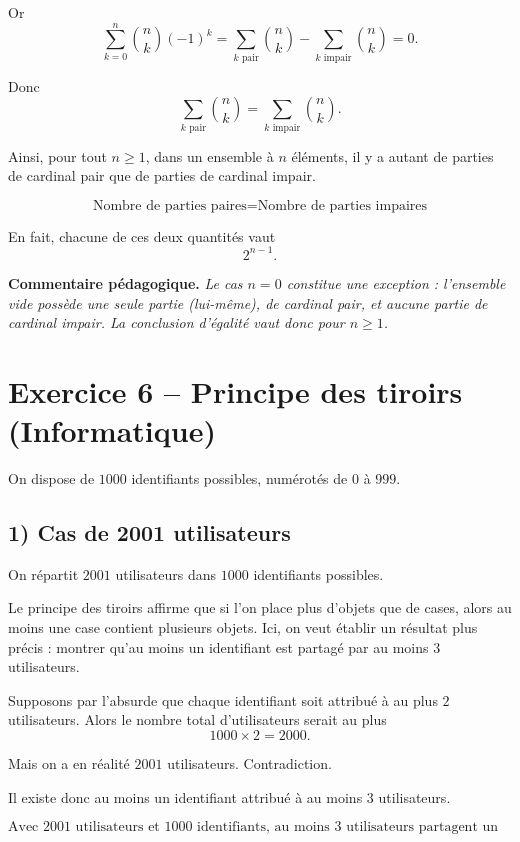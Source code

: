 \documentclass[12pt,a4paper]{article}
\newenvironment{pedago}
{\par\smallskip\noindent\textbf{Commentaire pédagogique. }\itshape}
{\par\smallskip}
\begin{document}
Or
\[
\sum_{k=0}^n \binom{n}{k} (-1)^k
=
\sum_{k\text{ pair}} \binom{n}{k}
-
\sum_{k\text{ impair}} \binom{n}{k}
=
0.
\]

Donc
\[
\sum_{k\text{ pair}} \binom{n}{k}
=
\sum_{k\text{ impair}} \binom{n}{k}.
\]

Ainsi, pour tout $n\ge 1$, dans un ensemble à $n$ éléments, il y a autant de parties de cardinal pair que de parties de cardinal impair.

\[
\boxed{\text{Nombre de parties paires}=\text{Nombre de parties impaires}}
\]

En fait, chacune de ces deux quantités vaut
\[
2^{n-1}.
\]

\begin{pedago}
Le cas $n=0$ constitue une exception : l'ensemble vide possède une seule partie (lui-même), de cardinal pair, et aucune partie de cardinal impair. La conclusion d'égalité vaut donc pour $n\ge 1$.
\end{pedago}

\bigskip

\section*{Exercice 6 -- Principe des tiroirs (Informatique)}

On dispose de $1000$ identifiants possibles, numérotés de $0$ à $999$.

\subsection*{1) Cas de 2001 utilisateurs}

On répartit $2001$ utilisateurs dans $1000$ identifiants possibles.

Le principe des tiroirs affirme que si l'on place plus d'objets que de cases, alors au moins une case contient plusieurs objets. Ici, on veut établir un résultat plus précis : montrer qu'au moins un identifiant est partagé par au moins $3$ utilisateurs.

Supposons par l'absurde que chaque identifiant soit attribué à au plus $2$ utilisateurs. Alors le nombre total d'utilisateurs serait au plus
\[
1000\times 2=2000.
\]

Mais on a en réalité $2001$ utilisateurs. Contradiction.

Il existe donc au moins un identifiant attribué à au moins $3$ utilisateurs.

\[
\boxed{\text{Avec 2001 utilisateurs et 1000 identifiants, au moins 3 utilisateurs partagent un même identifiant.}}
\]
\end{document}
